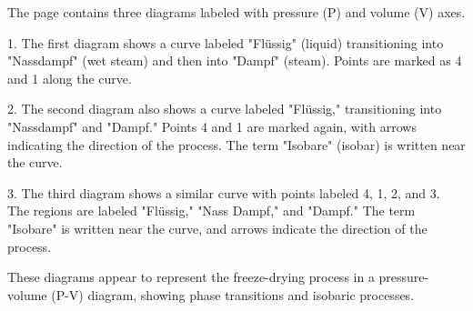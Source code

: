 The page contains three diagrams labeled with pressure (P) and volume (V) axes.  

1. The first diagram shows a curve labeled "Flüssig" (liquid) transitioning into "Nassdampf" (wet steam) and then into "Dampf" (steam). Points are marked as 4 and 1 along the curve.  

2. The second diagram also shows a curve labeled "Flüssig," transitioning into "Nassdampf" and "Dampf." Points 4 and 1 are marked again, with arrows indicating the direction of the process. The term "Isobare" (isobar) is written near the curve.  

3. The third diagram shows a similar curve with points labeled 4, 1, 2, and 3. The regions are labeled "Flüssig," "Nass Dampf," and "Dampf." The term "Isobare" is written near the curve, and arrows indicate the direction of the process.  

These diagrams appear to represent the freeze-drying process in a pressure-volume (P-V) diagram, showing phase transitions and isobaric processes.